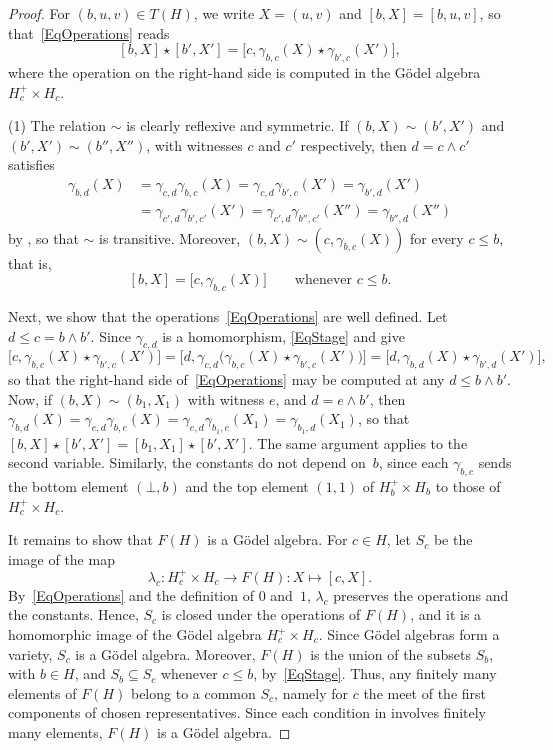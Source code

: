 \documentclass[reqno,a4paper]{amsart}
\theoremstyle{plain}
\theoremstyle{definition}
\theoremstyle{remark}
\numberwithin{equation}{section}
\begin{document}
\begin{proof}
For $(b,u,v)\in T(H)$, we write $X=(u,v)$ and $[b,X]=[b,u,v]$, so that~\eqref{EqOperations} reads
\[
[b,X]\star[b',X']=\bigl[c,\gamma_{b,c}(X)\star\gamma_{b',c}(X')\bigr],
\]
where the operation on the right-hand side is computed in the G\"odel algebra $H_c^+\times H_c$.

(1) The relation $\sim$ is clearly reflexive and symmetric. If $(b,X)\sim(b',X')$ and $(b',X')\sim(b'',X'')$, with witnesses $c$ and $c'$ respectively, then $d=c\wedge c'$ satisfies
\begin{align*}
\gamma_{b,d}(X)&=\gamma_{c,d}\gamma_{b,c}(X)=\gamma_{c,d}\gamma_{b',c}(X')=\gamma_{b',d}(X')\\
&=\gamma_{c',d}\gamma_{b',c'}(X')=\gamma_{c',d}\gamma_{b'',c'}(X'')=\gamma_{b'',d}(X'')
\end{align*}
by , so that $\sim$ is transitive. Moreover, $(b,X)\sim(c,\gamma_{b,c}(X))$ for every $c\leq b$, that is,
\begin{equation}\label{EqStage}
[b,X]=\bigl[c,\gamma_{b,c}(X)\bigr]\qquad\text{whenever }c\leq b.
\end{equation}

Next, we show that the operations~\eqref{EqOperations} are well defined. Let $d\leq c=b\wedge b'$. Since $\gamma_{c,d}$ is a homomorphism, \eqref{EqStage} and  give
\[
\bigl[c,\gamma_{b,c}(X)\star\gamma_{b',c}(X')\bigr]=\bigl[d,\gamma_{c,d}\bigl(\gamma_{b,c}(X)\star\gamma_{b',c}(X')\bigr)\bigr]=\bigl[d,\gamma_{b,d}(X)\star\gamma_{b',d}(X')\bigr],
\]
so that the right-hand side of~\eqref{EqOperations} may be computed at any $d\leq b\wedge b'$. Now, if $(b,X)\sim(b_1,X_1)$ with witness $e$, and $d=e\wedge b'$, then $\gamma_{b,d}(X)=\gamma_{e,d}\gamma_{b,e}(X)=\gamma_{e,d}\gamma_{b_1,e}(X_1)=\gamma_{b_1,d}(X_1)$, so that $[b,X]\star[b',X']=[b_1,X_1]\star[b',X']$. The same argument applies to the second variable. Similarly, the constants do not depend on~$b$, since each $\gamma_{b,c}$ sends the bottom element $(\bot,b)$ and the top element $(1,1)$ of $H_b^+\times H_b$ to those of $H_c^+\times H_c$.

It remains to show that $F(H)$ is a G\"odel algebra. For $c\in H$, let $S_c$ be the image of the map
\[
\lambda_c\colon H_c^+\times H_c\to F(H)\colon X\mapsto[c,X].
\]
By~\eqref{EqOperations} and the definition of $0$ and~$1$, $\lambda_c$ preserves the operations and the constants. Hence, $S_c$ is closed under the operations of $F(H)$, and it is a homomorphic image of the G\"odel algebra $H_c^+\times H_c$. Since G\"odel algebras form a variety, $S_c$ is a G\"odel algebra. Moreover, $F(H)$ is the union of the subsets $S_b$, with $b\in H$, and $S_b\subseteq S_c$ whenever $c\leq b$, by~\eqref{EqStage}. Thus, any finitely many elements of $F(H)$ belong to a common $S_c$, namely for $c$ the meet of the first components of chosen representatives. Since each condition in  involves finitely many elements, $F(H)$ is a G\"odel algebra.


\end{proof}
\end{document}
